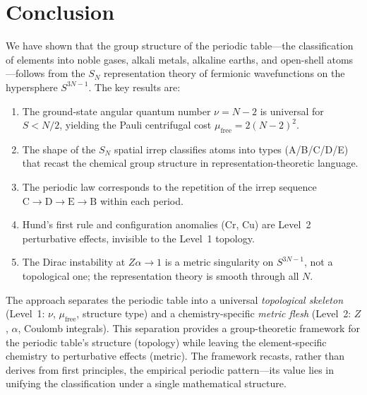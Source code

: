 \documentclass[aps,prl,twocolumn,superscriptaddress,longbibliography]{revtex4-2}
\newcommand{\mufree}{\mu_{\mathrm{free}}}
\begin{document}

\section{Conclusion}
\label{sec:conclusion}

We have shown that the group structure of the periodic table---the
classification of elements into noble gases, alkali metals, alkaline
earths, and open-shell atoms---follows from the $S_N$ representation
theory of fermionic wavefunctions on the hypersphere $S^{3N-1}$.  The
key results are:

\begin{enumerate}
  \item The ground-state angular quantum number $\nu = N - 2$ is
    universal for $S < N/2$, yielding the Pauli centrifugal cost
    $\mufree = 2(N-2)^2$.

  \item The shape of the $S_N$ spatial irrep classifies atoms into
    types (A/B/C/D/E) that recast the chemical group structure in
    representation-theoretic language.

  \item The periodic law corresponds to the repetition of the irrep
    sequence $\mathrm{C} \to \mathrm{D} \to \mathrm{E} \to
    \mathrm{B}$ within each period.

  \item Hund's first rule and configuration anomalies (Cr, Cu) are
    Level~2 perturbative effects, invisible to the Level~1 topology.

  \item The Dirac instability at $Z\alpha \to 1$ is a metric
    singularity on $S^{3N-1}$, not a topological one; the
    representation theory is smooth through all $N$.
\end{enumerate}

The approach separates the periodic table into a universal
\emph{topological skeleton} (Level~1: $\nu$, $\mufree$, structure
type) and a chemistry-specific \emph{metric flesh} (Level~2: $Z$,
$\alpha$, Coulomb integrals).  This separation provides a
group-theoretic framework for the periodic table's structure
(topology) while leaving the element-specific chemistry to
perturbative effects (metric).  The framework recasts, rather than
derives from first principles, the empirical periodic pattern---its
value lies in unifying the classification under a single
mathematical structure.
\end{document}
